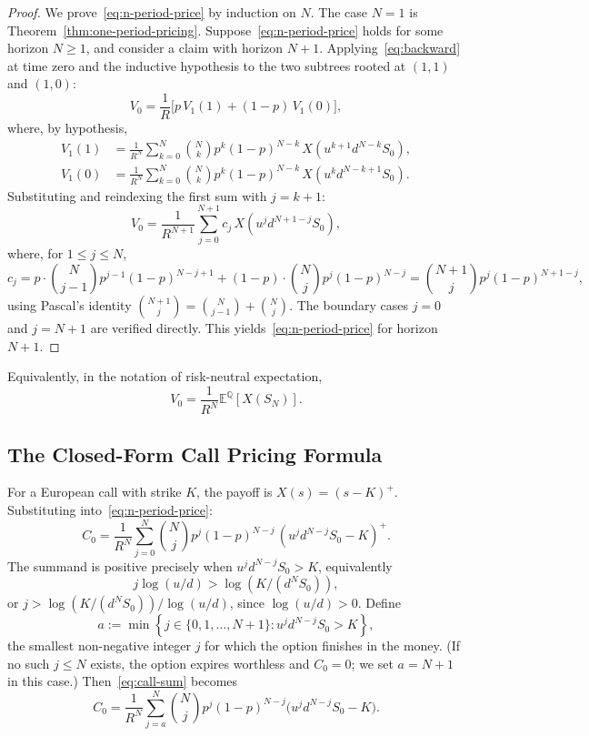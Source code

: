 \documentclass[11pt,a4paper]{article}
\theoremstyle{plain}
\theoremstyle{definition}
\newcommand{\E}{\mathbb{E}}
\newcommand{\Q}{\mathbb{Q}}
\begin{document}
\begin{proof}
We prove~\eqref{eq:n-period-price} by induction on $N$. The case $N = 1$
is Theorem~\ref{thm:one-period-pricing}. Suppose~\eqref{eq:n-period-price}
holds for some horizon $N \geq 1$, and consider a claim with horizon
$N+1$. Applying~\eqref{eq:backward} at time zero and the inductive
hypothesis to the two subtrees rooted at $(1,1)$ and $(1,0)$:
\[
V_0 = \frac{1}{R}\bigl[ p\, V_1(1) + (1-p)\, V_1(0) \bigr],
\]
where, by hypothesis,
\begin{align*}
V_1(1) &= \frac{1}{R^N} \sum_{k=0}^{N} \binom{N}{k} p^k (1-p)^{N-k}\,
         X(u^{k+1} d^{N-k} S_0), \\
V_1(0) &= \frac{1}{R^N} \sum_{k=0}^{N} \binom{N}{k} p^k (1-p)^{N-k}\,
         X(u^{k} d^{N-k+1} S_0).
\end{align*}
Substituting and reindexing the first sum with $j = k+1$:
\[
V_0 = \frac{1}{R^{N+1}} \sum_{j=0}^{N+1} c_j\, X(u^j d^{N+1-j} S_0),
\]
where, for $1 \leq j \leq N$,
\[
c_j = p \cdot \binom{N}{j-1} p^{j-1}(1-p)^{N-j+1}
    + (1-p) \cdot \binom{N}{j} p^j (1-p)^{N-j}
    = \binom{N+1}{j} p^j (1-p)^{N+1-j},
\]
using Pascal's identity $\binom{N+1}{j} = \binom{N}{j-1} + \binom{N}{j}$.
The boundary cases $j = 0$ and $j = N+1$ are verified directly. This
yields~\eqref{eq:n-period-price} for horizon $N+1$.
\end{proof}

Equivalently, in the notation of risk-neutral expectation,
\begin{equation}
    \label{eq:risk-neutral-N}
    V_0 = \frac{1}{R^N} \E^{\Q}[X(S_N)].
\end{equation}

\subsection{The Closed-Form Call Pricing Formula}
\label{subsec:closed-form}

For a European call with strike $K$, the payoff is $X(s) = (s - K)^+$.
Substituting into~\eqref{eq:n-period-price}:
\begin{equation}
    \label{eq:call-sum}
    C_0 = \frac{1}{R^N} \sum_{j=0}^{N} \binom{N}{j} p^j (1-p)^{N-j}\,
          (u^j d^{N-j} S_0 - K)^+.
\end{equation}
The summand is positive precisely when $u^j d^{N-j} S_0 > K$, equivalently
\[
j \log(u/d) > \log(K / (d^N S_0)),
\]
or $j > \log(K / (d^N S_0))/\log(u/d)$, since $\log(u/d) > 0$. Define
\begin{equation}
    \label{eq:def-a}
    a := \min\left\{ j \in \{0, 1, \dots, N+1\} :
              u^j d^{N-j} S_0 > K \right\},
\end{equation}
the smallest non-negative integer $j$ for which the option finishes in
the money. (If no such $j \leq N$ exists, the option expires worthless and
$C_0 = 0$; we set $a = N+1$ in this case.) Then~\eqref{eq:call-sum}
becomes
\begin{equation}
    \label{eq:call-truncated}
    C_0 = \frac{1}{R^N} \sum_{j=a}^{N} \binom{N}{j} p^j (1-p)^{N-j}
          \bigl( u^j d^{N-j} S_0 - K \bigr).
\end{equation}
\end{document}
